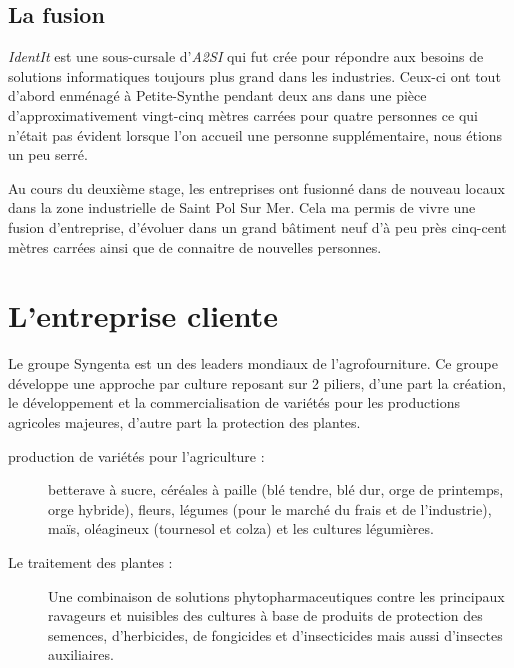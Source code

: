 
\subsection{La fusion} %
\label{sub:La fusion}

\emph{IdentIt} est une sous-cursale d'\emph{A2SI} qui fut crée pour
répondre aux besoins de solutions informatiques toujours plus grand dans
les industries. Ceux-ci ont tout d'abord enménagé à Petite-Synthe
pendant deux ans dans une pièce d'approximativement vingt-cinq mètres carrées
pour quatre personnes ce qui n'était pas évident lorsque l'on accueil
une personne supplémentaire, nous étions un peu serré.

Au cours du deuxième stage, les entreprises ont \og fusionné \fg{} dans
de nouveau locaux dans la zone industrielle de Saint Pol Sur Mer. Cela
ma permis de vivre une fusion d'entreprise, d'évoluer dans un grand
bâtiment neuf d'à peu près cinq-cent mètres carrées ainsi que de
connaitre de nouvelles personnes.



\section{L'entreprise cliente} %
\label{sec:L'entreprise cliente}

Le groupe Syngenta est un des leaders mondiaux de l’agrofourniture.
Ce groupe développe une approche par culture reposant sur 2 piliers,
d'une part la création, le développement et la commercialisation de
variétés pour les productions agricoles majeures, d'autre part la
protection des plantes.

\begin{description}

  \item[production de variétés pour l'agriculture :] betterave à sucre,
    céréales à paille (blé tendre, blé dur, orge de printemps, orge
    hybride), fleurs, légumes (pour le marché du frais et de
    l’industrie), maïs, oléagineux (tournesol et colza) et les cultures
    légumières.

  \item[Le traitement des plantes :] Une combinaison de solutions
    phytopharmaceutiques contre les principaux ravageurs et nuisibles
    des cultures à base de produits de protection des semences,
    d’herbicides, de fongicides et d’insecticides mais aussi d’insectes
    auxiliaires.

\end{description}


